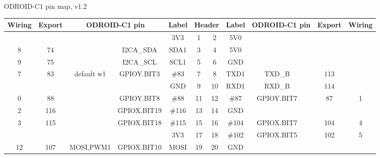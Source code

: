 \documentclass[a4paper,12pt]{article}
\newcommand{\thistitle}{ODROID-C1 pin map, v1.2}
\newcommand{\tFPWM}[1]{\textcolor{clPWM}{#1}}
\newcommand{\tFSPI}[1]{\textcolor{clSPI}{#1}}
\newcommand{\tFIIC}[1]{\textcolor{clIIC}{#1}}
\newcommand{\cheader}[1]{\sffamily\textbf{\textcolor{headercolor}{#1}}}
\newcommand{\sepline}{\cline{1-5}\cline{8-12}}
\newcommand{\cpwr}{\cellcolor{pwrcolor}}
\newcommand{\cgpio}{\cellcolor{gpiocolor}}
\newcommand{\cspc}{\cellcolor{specialcolor}}
\newcommand{\tfl}{\textendash}
\begin{document}
\begin{center}
\Huge{}\thistitle
\end{center}

\begin{center}
\ttfamily
\begin{tabular}{ccccc|cc|ccccc}
\hline
\cheader{Wiring} & \cheader{Export} & \multicolumn{2}{c}{\cheader{ODROID-C1 pin}} & \cheader{Label} & \multicolumn{2}{|c|}{\cheader{Header}} & \cheader{Label} & \multicolumn{2}{c}{\cheader{ODROID-C1 pin}} & \cheader{Export} & \cheader{Wiring}\\
\hline
\hline
 \tfl  & \tfl   &                 & \tfl           & 3V3   & \cpwr{}1      & \cpwr{}2     & 5V0   & \tfl           &                 & \tfl   & \tfl    \\
 8     & 74     &                 & \tFIIC{I2CA\_SDA}      & SDA1  & \cspc{}3      & \cpwr{}4     & 5V0   & \tfl           &                 & \tfl   & \tfl    \\
 9     & 75     &                 & \tFIIC{I2CA\_SCL}      & SCL1  & \cspc{}5      & \cpwr{}6     & GND   & \tfl           &                 & \tfl   & \tfl    \\
 7     & 83     & default w1      & GPIOY.BIT3     & \#83  & \cgpio{}7     & \cgpio{}8    & TXD1  & TXD\_B         &                 & 113    & \tfl    \\
 \tfl  & \tfl   &                 & \tfl           & GND   & \cpwr{}9      & \cgpio{}10   & RXD1  & RXD\_B         &                 & 114    & \tfl    \\
\sepline
 0     & 88     &                 & GPIOY.BIT8     & \#88  & \cgpio{}11    & \cgpio{}12   & \#87  & GPIOY.BIT7     &                 & 87     & 1     \\
 2     & 116    &                 & GPIOX.BIT19    & \#116 & \cgpio{}13    & \cpwr{}14    & GND   & \tfl           &                 & \tfl   & \tfl    \\
 3     & 115    &                 & GPIOX.BIT18    & \#115 & \cgpio{}15    & \cgpio{}16   & \#104 & GPIOX.BIT7     &                 & 104    & 4     \\
 \tfl  & \tfl   &                 & \tfl           & 3V3   & \cpwr{}17     & \cgpio{}18   & \#102 & GPIOX.BIT5     &                 & 102    & 5     \\
 12    & 107    & \tFSPI{MOSI},\tFPWM{PWM1} & GPIOX.BIT10    & MOSI  & \cgpio{}19    & \cpwr{}20    & GND   & \tfl           &                 & \tfl   & \tfl    \\

\end{tabular}
\end{center}
\end{document}
